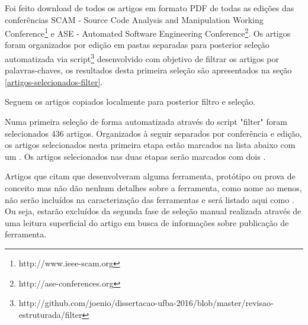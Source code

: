 
Foi feito download de todos os artigos em formato PDF de todas as edições das
conferências SCAM - Source Code Analysis and Manipulation Working
Conference\footnote{http://www.ieee-scam.org} e ASE - Automated Software
Engineering Conference\footnote{http://ase-conferences.org}.
Os artigos foram organizados por edição em pastas separadas para posterior
seleção automatizada via script\footnote{http://github.com/joenio/dissertacao-ufba-2016/blob/master/revisao-estruturada/filter} desenvolvido com objetivo de filtrar os
artigos por palavras-chaves, os resultados desta primeira seleção são apresentados
na seção \ref{artigos-selecionados-filter}.

Seguem os artigos copiados localmente para posterior filtro e seleção.

Numa primeira seleção de forma automatizada através do script "filter" foram
selecionados 436 artigos. Organizados à seguir separados por conferência e
edição, os artigos selecionados nesta primeira etapa estão marcados na lista
abaixo com um {\color{blue} \checkmark}. Os artigos selecionados nas duas
etapas serão marcados com dois {\color{blue} \checkmark \checkmark}.

Artigos que citam que desenvolveram alguma ferramenta, protótipo ou prova de
conceito mas não dão nenhum detalhes sobre a ferramenta, como nome ao menos,
não serão incluídos na caracterização das ferramentas e será listado aqui como
{\color{blue} \checkmark}{\color{red} \texttimes}. Ou seja, estarão excluídos
da segunda fase de seleção manual realizada através de uma leitura superficial
do artigo em busca de informações sobre publicação de ferramenta.

%
%
%
%
%
%
%

